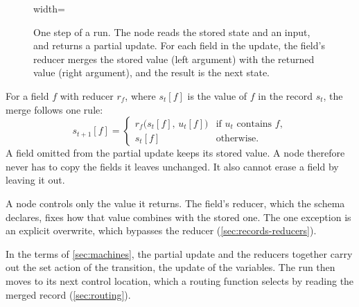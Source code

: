 \begin{figure}[htbp]
  \centering
  \begin{adjustbox}{width=\linewidth}
  \end{adjustbox}
  \caption{One step of a run. The node reads the stored state and an input, and returns a partial
  update. For each field in the update, the field's reducer merges the stored value (left argument)
  with the returned value (right argument), and the result is the next state.}
  \label{fig:records-update}
\end{figure}

For a field $f$ with reducer $r_f$, where $s_t[f]$ is the value of $f$ in the record $s_t$, the
merge follows one rule:
\begin{equation*}
  s_{t+1}[f] =
  \begin{cases}
    r_f\bigl(s_t[f],\, u_t[f]\bigr) & \text{if } u_t \text{ contains } f,\\[2pt]
    s_t[f] & \text{otherwise.}
  \end{cases}
\end{equation*}
A field omitted from the partial update keeps its stored value. A node therefore never has to copy
the fields it leaves unchanged. It also cannot erase a field by leaving it out.

A node controls only the value it returns. The field's reducer, which the schema declares, fixes how
that value combines with the stored one. The one exception is an explicit overwrite, which bypasses
the reducer (\cref{sec:records-reducers}).

In the terms of \cref{sec:machines}, the partial update and the reducers together carry out the set
action of the transition, the update of the variables. The run then moves to its next control
location, which a routing function selects by reading the merged record (\cref{sec:routing}).

